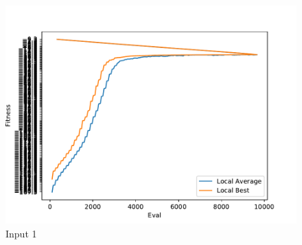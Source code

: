 \documentclass{standalone}
\begin{document}
\begin{figure}[!htb]
	\caption{Input 1}
	\label{fig:graph_1022}
	\includegraphics[width=\textwidth]{../graphs/graphs/1022.pdf}
\end{figure}
\end{document}
